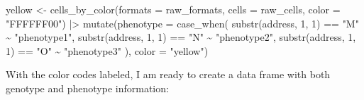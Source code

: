 \documentclass[
]{book}
\newenvironment{Shaded}{\begin{snugshade}}{\end{snugshade}}
\newcommand{\AttributeTok}[1]{\textcolor[rgb]{0.77,0.63,0.00}{#1}}
\newcommand{\DecValTok}[1]{\textcolor[rgb]{0.00,0.00,0.81}{#1}}
\newcommand{\FunctionTok}[1]{\textcolor[rgb]{0.00,0.00,0.00}{#1}}
\newcommand{\NormalTok}[1]{#1}
\newcommand{\OtherTok}[1]{\textcolor[rgb]{0.56,0.35,0.01}{#1}}
\newcommand{\SpecialCharTok}[1]{\textcolor[rgb]{0.00,0.00,0.00}{#1}}
\newcommand{\StringTok}[1]{\textcolor[rgb]{0.31,0.60,0.02}{#1}}
\begin{document}
\begin{Shaded}
\begin{Highlighting}[]
\NormalTok{yellow }\OtherTok{\textless{}{-}} \FunctionTok{cells\_by\_color}\NormalTok{(}\AttributeTok{formats =}\NormalTok{ raw\_formats,}
                         \AttributeTok{cells =}\NormalTok{ raw\_cells,}
                         \AttributeTok{color =} \StringTok{"FFFFFF00"}\NormalTok{) }\SpecialCharTok{|\textgreater{}} 
  \FunctionTok{mutate}\NormalTok{(}\AttributeTok{phenotype =} \FunctionTok{case\_when}\NormalTok{(}
    \FunctionTok{substr}\NormalTok{(address, }\DecValTok{1}\NormalTok{, }\DecValTok{1}\NormalTok{) }\SpecialCharTok{==} \StringTok{"M"} \SpecialCharTok{\textasciitilde{}} \StringTok{"phenotype1"}\NormalTok{,}
    \FunctionTok{substr}\NormalTok{(address, }\DecValTok{1}\NormalTok{, }\DecValTok{1}\NormalTok{) }\SpecialCharTok{==} \StringTok{"N"} \SpecialCharTok{\textasciitilde{}} \StringTok{"phenotype2"}\NormalTok{,}
    \FunctionTok{substr}\NormalTok{(address, }\DecValTok{1}\NormalTok{, }\DecValTok{1}\NormalTok{) }\SpecialCharTok{==} \StringTok{"O"} \SpecialCharTok{\textasciitilde{}} \StringTok{"phenotype3"}
\NormalTok{  ),}
  \AttributeTok{color =} \StringTok{"yellow"}\NormalTok{)}
\end{Highlighting}
\end{Shaded}

With the color codes labeled, I am ready to create a data frame with both genotype and phenotype information:
\end{document}
